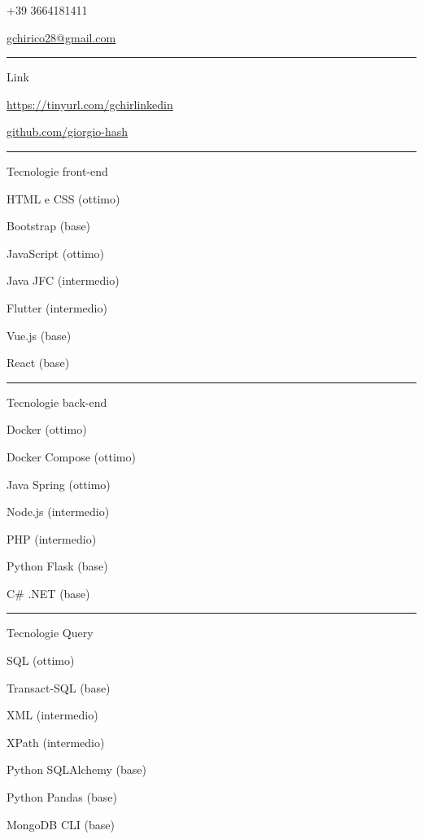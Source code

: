 \documentclass[a4paper]{letter}
\begin{document}
\begin{minipage}[t]{0.30\textwidth}
\faPhone \quad +39 3664181411

\faEnvelope \quad \href{mailto://gchirico28@gmail.com}{gchirico28@gmail.com}

\rule{\linewidth}{0.4pt}

{\large Link}

\faLinkedin \quad \href{https://tinyurl.com/gchirlinkedin}{https://tinyurl.com/gchirlinkedin}

\faGithub \quad \href{https://github.com/giorgio-hash}{github.com/giorgio-hash}

\rule{\linewidth}{0.4pt}

{\large Tecnologie front-end}

\faCode \quad HTML e CSS (ottimo)

\faCode \quad Bootstrap (base)

\faCode \quad JavaScript (ottimo)

\faCode \quad Java JFC (intermedio)

\faCode \quad Flutter (intermedio)

\faCode \quad Vue.js (base)

\faCode \quad React (base)



\rule{\linewidth}{0.4pt}

{\large Tecnologie back-end}

\faCode \quad Docker (ottimo)

\faCode \quad Docker Compose (ottimo)

\faCode \quad Java Spring (ottimo)

\faCode \quad Node.js (intermedio)

\faCode \quad PHP (intermedio)

\faCode \quad Python Flask (base)

\faCode \quad C\# .NET (base)

\rule{\linewidth}{0.4pt}


{\large Tecnologie Query}

\faCode \quad SQL (ottimo)

\faCode \quad Transact-SQL (base)

\faCode \quad XML (intermedio)

\faCode \quad XPath (intermedio)

\faCode \quad Python SQLAlchemy (base)

\faCode \quad Python Pandas (base)

\faCode \quad MongoDB CLI (base)



\end{minipage}
\end{document}
